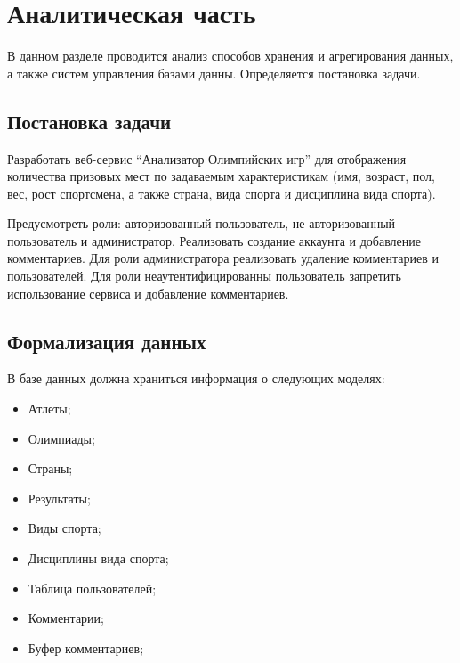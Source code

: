 \chapter{Аналитическая часть}

В данном разделе проводится анализ способов хранения и агрегирования данных, а также  систем управления базами данны. Определяется постановка задачи.

\section{Постановка задачи}

Разработать веб-сервис “Анализатор Олимпийских игр” для отображения количества 
призовых мест по задаваемым характеристикам 
(имя, возраст, пол, вес, рост спортсмена, а также страна, вида спорта и дисциплина вида спорта).

Предусмотреть роли: авторизованный пользователь, не авторизованный пользователь и администратор. Реализовать создание аккаунта и добавление комментариев.
Для роли администратора реализовать удаление комментариев и пользователей. Для роли неаутентифицированны пользователь запретить использование сервиса и добавление комментариев.

\newpage
\section{Формализация данных}

В базе данных должна храниться информация о следующих моделях:

\begin{itemize}
	
	\item Атлеты;
	
	\item Олимпиады;
	
	\item Страны;
	
	\item Результаты;
	
	\item Виды спорта;
	
	\item Дисциплины вида спорта;
	
	\item Таблица пользователей;
	
	\item Комментарии;
	
	\item Буфер комментариев;
	
\end{itemize}


